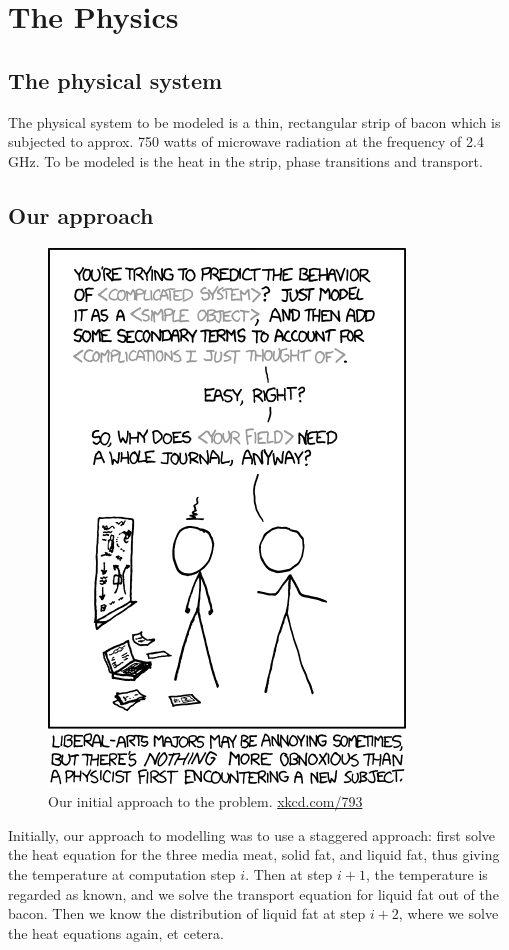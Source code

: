 \chapter{The Physics}
\section{The physical system}
The physical system to be modeled is a thin, rectangular strip of bacon which is
subjected to approx. 750 watts of microwave radiation at the frequency of 2.4
GHz. To be modeled is the heat in the strip, phase transitions and transport.

\section{Our approach}
\begin{figure}[!h]
  \begin{center}
    \includegraphics[width=0.35\linewidth]{physicists.png}
  \end{center}
  \caption{Our initial approach to the problem. \url{xkcd.com/793}}
  \label{fig:xkcd_physics}
\end{figure}

Initially, our approach to modelling was to use a staggered approach: first solve the
heat equation for the three media meat, solid fat, and liquid fat, thus giving
the temperature at computation step $i$. Then at step $i+1$, the temperature is regarded as
known, and we solve the transport equation for liquid fat out of the bacon. Then
we know the distribution of liquid fat at step $i+2$, where we solve the heat
equations again, et cetera.

